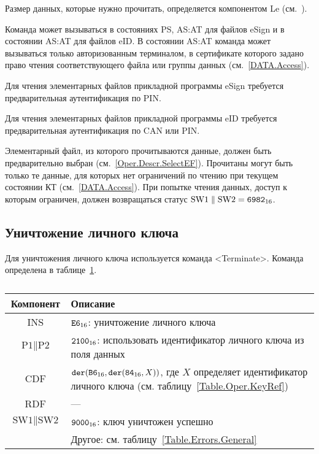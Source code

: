 Размер данных, которые нужно прочитать, определяется компонентом 
Le (см.~\cite{APDU}).

Команда может вызываться в состояниях PS, AS:AT 
для файлов eSign и в состоянии AS:AT для файлов eID.
В состоянии AS:AT команда может вызываться только 
авторизованным терминалом, в сертификате которого
задано право чтения соответствующего файла или группы данных
(см.~\ref{DATA.Access}).

Для чтения элементарных файлов прикладной программы eSign 
требуется предварительная аутентификация по PIN.

Для чтения элементарных файлов прикладной программы eID 
требуется предварительная аутентификация по CAN или PIN.

Элементарный файл, из которого прочитываются данные, должен быть предварительно 
выбран (см.~\ref{Oper.Descr.SelectEF}). Прочитаны могут быть только те данные, 
для которых нет ограничений по чтению при текущем состоянии КТ 
(см.~\ref{DATA.Access}). При попытке чтения данных, доступ к которым ограничен, 
должен возвращаться статус $\text{SW1} \parallel \text{SW2} = \texttt{6982}_{16}$.

\subsection{Уничтожение личного ключа}
\label{Oper.Descr.Terminate}

Для уничтожения личного ключа используется команда <Terminate>.
Команда определена в таблице~\ref{Table.Oper.TerminateCmd}.

\begin{table}[ht]
\caption{}\label{Table.Oper.TerminateCmd}
\begin{tabular}{|c|p{14cm}|}
\hline
Компонент & Описание\\
\hline
\hline
INS & $\texttt{E6}_{16}$: уничтожение личного ключа\\
\hline
$\text{P1} \parallel\text{P2}$ & $\texttt{2100}_{16}$:
использовать идентификатор личного ключа из поля данных\\
\hline
CDF &  $\texttt{der}(\texttt{B6}_{16},\texttt{der}(\texttt{84}_{16}, X))$,
где $X$ определяет идентификатор личного ключа
(см. таблицу~\ref{Table.Oper.KeyRef})\\ 
\hline 
\hline
RDF & ---  \\
\hline
$\text{SW1} \parallel \text{SW2}$ & 
$\texttt{9000}_{16}$: ключ уничтожен успешно\\
\cline{2-2}
 & Другое: см. таблицу~\ref{Table.Errors.General}\\
\hline
\end{tabular}
\end{table}

